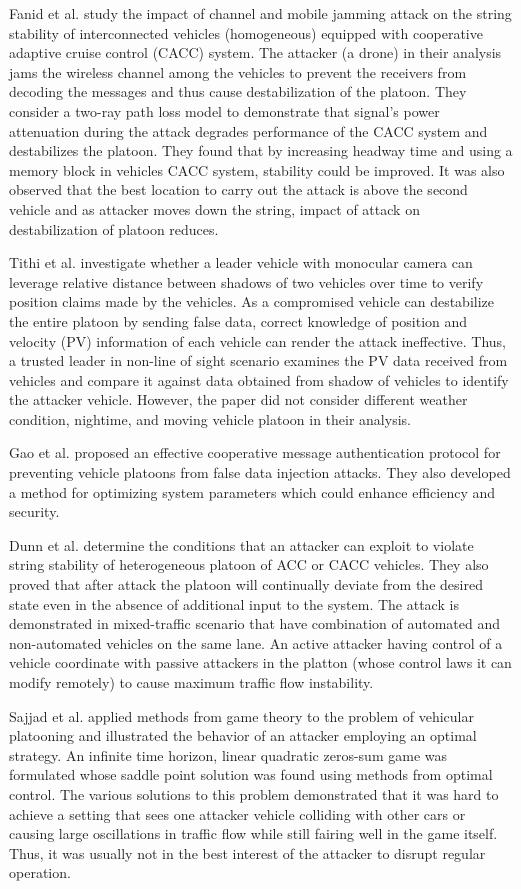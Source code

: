 Fanid et al. \cite{FDZZ17} study the impact of channel and mobile jamming attack on the string stability of interconnected vehicles (homogeneous) equipped with  cooperative adaptive cruise control (CACC) system. The attacker (a drone) in their analysis jams the wireless channel among the vehicles to prevent the receivers from decoding the messages and thus cause destabilization of the platoon. They consider a two-ray path loss model to demonstrate that signal's power attenuation during the attack degrades performance of the CACC system and destabilizes the platoon. They found that by increasing headway time and using a memory block in vehicles CACC system, stability could be improved.  It was also observed that the best location to carry out the attack is above the second vehicle and as attacker moves down the string, impact of attack on destabilization of platoon reduces.  

Tithi et al. \cite{TWG17} investigate whether a leader vehicle with monocular camera can leverage relative distance between shadows of two vehicles over time to verify position claims made by the vehicles. As a compromised vehicle can destabilize the entire platoon by sending false data, correct knowledge of position and velocity (PV) information of each vehicle can render the attack ineffective. Thus, a trusted leader in non-line of sight scenario examines the PV data received from vehicles and compare it against data obtained from shadow of vehicles to identify the attacker vehicle. However, the paper did not consider different weather condition, nightime, and moving vehicle platoon in their analysis. 

Gao et al. \cite{GRZ16}  proposed an effective cooperative message authentication protocol for preventing vehicle platoons from false data injection attacks. They also developed a method for optimizing system parameters which could enhance efficiency and security. 

Dunn et al. \cite{DMSGSL17} determine the conditions that an attacker can exploit to violate string stability of heterogeneous platoon of ACC or CACC vehicles. They also proved that after attack the platoon will continually deviate from the desired state even in the absence of additional input to the system. The attack is demonstrated in mixed-traffic scenario that have combination of automated and non-automated vehicles on the same lane. An active attacker having control of a vehicle coordinate with passive attackers in the platton (whose control laws it can modify remotely) to cause maximum traffic flow instability. 

Sajjad et al. \cite{SSG17} applied methods from game theory to the problem of vehicular platooning and illustrated the behavior of an attacker employing an optimal strategy.  An infinite time horizon, linear quadratic zeros-sum game was formulated whose saddle point solution was found using methods from optimal control. The various solutions to this problem demonstrated that it was hard to achieve a setting that sees one  attacker vehicle colliding with other cars or causing large oscillations in traffic flow while still fairing well in the game itself. Thus, it was usually not in the best interest of the attacker to disrupt regular operation. 
 


